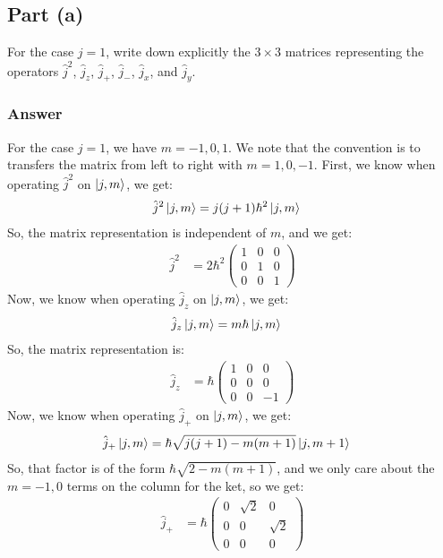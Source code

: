\documentclass{article}
\begin{document}
\subsection{Part (a)}
For the case \( j=1 \), write down explicitly the \( 3 \times 3 \) matrices representing the operators \( \hat{j}^2 \), \( \hat{j}_z \), \( \hat{j}_+ \), \( \hat{j}_- \), \( \hat{j}_x \), and \( \hat{j}_y \).

\subsubsection{Answer}
For the case $j = 1$, we have $m = -1, 0, 1$. We note that the convention is to transfers the matrix from left to right with $m = 1, 0, -1$. First, we know when operating  $\hat{j}^2$ on $\ket{j, m}$, we get:
\begin{align}
\hat{j}^2 \ket{j, m} &= j(j+1) \hbar ^2 \ket{j, m}
\end{align}
So, the matrix representation is independent of $m$, and we get:
\begin{align}
\hat{j}^2 &= 2\hbar ^2 \begin{pmatrix}
1 & 0 & 0 \\
0 & 1 & 0 \\
0 & 0 & 1
\end{pmatrix}
\end{align}
Now, we know when operating  $\hat{j}_z$ on $\ket{j, m}$, we get:
\begin{align}
\hat{j}_z \ket{j, m} &= m \hbar \ket{j, m}
\end{align}
So, the matrix representation is:
\begin{align}
\hat{j}_z &= \hbar \begin{pmatrix}
1 & 0 & 0 \\
0 & 0 & 0 \\
0 & 0 & -1
\end{pmatrix}
\end{align}
Now, we know when operating  $\hat{j}_+$ on $\ket{j, m}$, we get:
\begin{align}
\hat{j}_+ \ket{j, m} &= \hbar \sqrt{j(j+1) - m(m+1)} \ket{j, m+1}
\end{align}
So, that factor is of the form $\hbar\sqrt{2 - m(m+1)}$, and we only care about the $m = -1, 0$ terms  on the column for the ket, so we get:
\begin{align}
\hat{j}_+ &= \hbar \begin{pmatrix}
0 & \sqrt{2} & 0 \\
0 & 0 & \sqrt{2} \\
0 & 0 & 0
\end{pmatrix}
\end{align}
\end{document}
